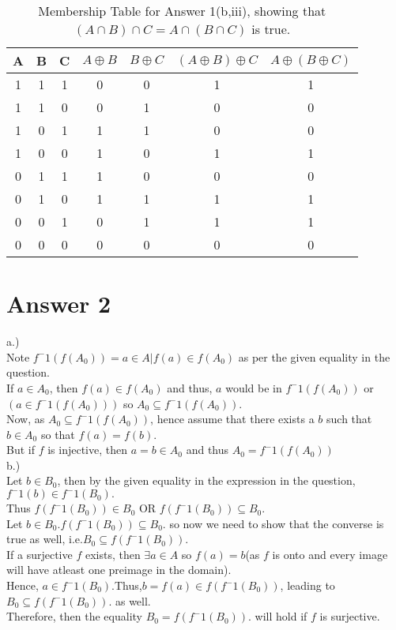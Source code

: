 \documentclass[11pt]{article}
\begin{document}
\begin{table}[h]
\small
\centering
\caption{Membership Table for Answer 1(b,iii), showing that $(A\cap B)\cap C = A \cap(B \cap C)$ is true.}
\label{table:example}
\begin{tabular}{|c|c|c|c|c|c|c}	%
\hline 							%
\textbf{A} & \textbf{B} & \textbf{C} & \textbf{$A \oplus B$} & \textbf{$B \oplus C$} & \textbf{$(A \oplus B)\oplus C$} & \textbf{$A \oplus (B \oplus C)$}\\%
\hline 
\hline 
1 & 1 & 1 & 0 & 0 & 1 & 1 \\%
1 & 1 & 0 & 0 & 1 & 0 & 0 \\
1 & 0 & 1 & 1 & 1 & 0 & 0 \\
1 & 0 & 0 & 1 & 0 & 1 & 1 \\
0 & 1 & 1 & 1 & 0 & 0 & 0 \\
0 & 1 & 0 & 1 & 1 & 1 & 1 \\
0 & 0 & 1 & 0 & 1 & 1 & 1 \\
0 & 0 & 0 & 0 & 0 & 0 & 0 \\
\hline
\end{tabular}
\end{table}

\section*{Answer 2}
a.)\\
Note $f^-1 (f(A_0))={a\in A|f(a)\in f(A_0)}$ as per the given equality in the question.\\
If $a \in A_0$, then $f(a) \in f(A_0)$ and thus, $a$ would be in $f^-1(f(A_0))$ or $(a \in f^-1(f(A_0)))$ so $A_0 \subseteq f^-1(f(A_0)).$\\
Now, as $A_0 \subseteq f^-1(f(A_0))$,  hence assume that there exists a $b$ such that $b \in A_0$ so that $f(a)=f(b)$.\\
But if $f$ is injective, then $a = b \in A_0$ and thus $A_0 = f^-1(f(A_0))$\\
b.)\\
Let $b \in B_0$, then by the given equality in the expression in the question, $f^-1(b) \in f^-1(B_0).$\\Thus $f(f^-1(B_0)) \in B_0$ OR $f(f^-1(B_0)) \subseteq B_0.$\\
Let $b \in B_0$.$f(f^-1(B_0)) \subseteq B_0.$ so now we need to show that the converse is true as well, i.e.$B_0 \subseteq f(f^-1(B_0)).$\\
If a surjective $f$ exists, then $\exists a \in A$ so $f(a)=b$(as $f$ is onto and every image will have atleast one preimage in the domain).\\
Hence, $a \in f^-1(B_0)$.Thus,$b=f(a) \in f(f^-1(B_0))$, leading to $B_0 \subseteq f(f^-1(B_0)).$ as well.\\
Therefore, then the equality  $B_0 = f(f^-1(B_0)).$ will hold if $f$ is surjective.\\
\end{document}
